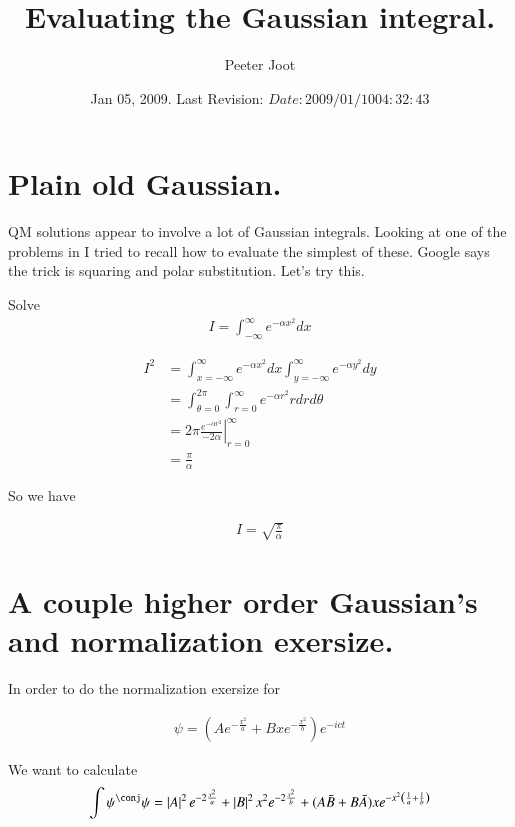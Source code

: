 \documentclass{article}
\title{ Evaluating the Gaussian integral. }
\author{Peeter Joot}
\date{ Jan 05, 2009.  Last Revision: $Date: 2009/01/10 04:32:43 $ }
\begin{document}
\maketitle{}
\section{ Plain old Gaussian. }

QM solutions appear to involve a lot of Gaussian integrals.  Looking at one
of the problems in \cite{mcmahon2005qmd} I tried to recall how to evaluate
the simplest of these.  Google says the trick is squaring and polar 
substitution.  Let's try this.

Solve
\begin{align*}
I = \int_{-\infty}^\infty e^{-\alpha x^2} dx
\end{align*}

\begin{align*}
I^2 
&= \int_{x= -\infty}^\infty e^{-\alpha x^2} dx \int_{y = -\infty}^\infty e^{-\alpha y^2} dy \\
&= \int_{\theta=0}^{2\pi}\int_{r= 0}^\infty e^{-\alpha r^2} r dr d\theta \\
&= 2\pi 
{\left.
\frac{e^{-\alpha r^2}}{-2\alpha}
\right\vert}_{r= 0}^\infty  \\
&= \frac{\pi}{\alpha}
\end{align*}

So we have

\begin{align*}
I = \sqrt{\frac{\pi}{\alpha}}
\end{align*}

\section{ A couple higher order Gaussian's and normalization exersize. }

In order to do the normalization exersize for

\begin{align}\label{eqn:exersize}
\psi = \left(A e^{-\frac{x^2}{a}} +B x e^{-\frac{x^2}{b}}\right) e^{-ict}
\end{align}

We want to calculate
\begin{align*}
\int \psi^\conj \psi = 
\Abs{A}^2 e^{-2\frac{x^2}{a}} +\Abs{B}^2 x^2 e^{-2\frac{x^2}{b}}
+ (A\bar{B} + B\bar{A}) x e^{-x^2\left(\inv{a} + \inv{b}\right)}
\end{align*}
\end{document}

